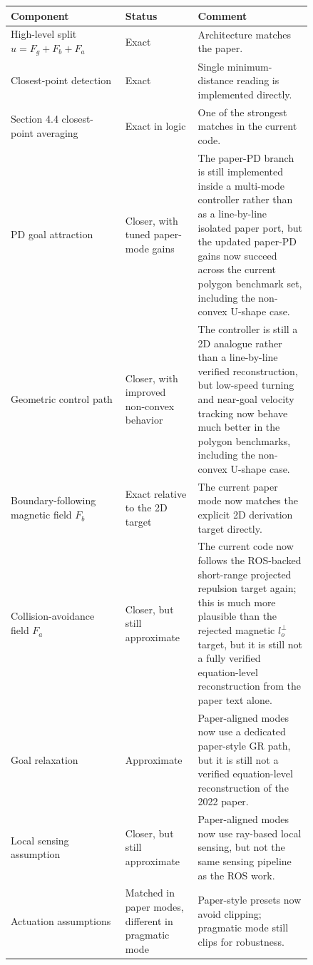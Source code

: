 \documentclass[11pt]{article}
\begin{document}
\begin{longtable}{|p{0.34\linewidth}|p{0.16\linewidth}|p{0.34\linewidth}|}
\hline
\textbf{Component} & \textbf{Status} & \textbf{Comment} \\
\hline
High-level split \(u = F_g + F_b + F_a\) & Exact & Architecture matches the paper. \\
\hline
Closest-point detection & Exact & Single minimum-distance reading is implemented directly. \\
\hline
Section 4.4 closest-point averaging & Exact in logic & One of the strongest matches in the current code. \\
\hline
PD goal attraction & Closer, with tuned paper-mode gains & The paper-PD branch is still implemented inside a multi-mode controller rather than as a line-by-line isolated paper port, but the updated paper-PD gains now succeed across the current polygon benchmark set, including the non-convex U-shape case. \\
\hline
Geometric control path & Closer, with improved non-convex behavior & The controller is still a 2D analogue rather than a line-by-line verified reconstruction, but low-speed turning and near-goal velocity tracking now behave much better in the polygon benchmarks, including the non-convex U-shape case. \\
\hline
Boundary-following magnetic field \(F_b\) & Exact relative to the 2D target & The current paper mode now matches the explicit 2D derivation target directly. \\
\hline
Collision-avoidance field \(F_a\) & Closer, but still approximate & The current code now follows the ROS-backed short-range projected repulsion target again; this is much more plausible than the rejected magnetic \(l_o^\perp\) target, but it is still not a fully verified equation-level reconstruction from the paper text alone. \\
\hline
Goal relaxation & Approximate & Paper-aligned modes now use a dedicated paper-style GR path, but it is still not a verified equation-level reconstruction of the 2022 paper. \\
\hline
Local sensing assumption & Closer, but still approximate & Paper-aligned modes now use ray-based local sensing, but not the same sensing pipeline as the ROS work. \\
\hline
Actuation assumptions & Matched in paper modes, different in pragmatic mode & Paper-style presets now avoid clipping; pragmatic mode still clips for robustness. \\
\hline
\end{longtable}
\end{document}
